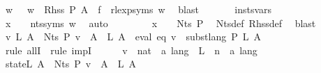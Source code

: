 \begin{isabellebody}
\ w\ \ {\isacharasterisk}{\kern0pt}{\isacharasterisk}{\kern0pt}{\isacharasterisk}{\kern0pt}{\isacharcolon}{\kern0pt}\ {\isachardoublequoteopen}w\ {\isasymin}\ Rhss\ P\ A\ {\isasymand}\ f\ {\isacharequal}{\kern0pt}\ rlexp{\isacharunderscore}{\kern0pt}syms\ w{\isachardoublequoteclose}\ \isamarkupfalse%
\ blast\isanewline
\ \ \ \ \isamarkupfalse%
\ {\isacharasterisk}{\kern0pt}{\isacharasterisk}{\kern0pt}\ insts{\isacharprime}{\kern0pt}{\isacharunderscore}{\kern0pt}vars\ \isamarkupfalse%
\ {\isachardoublequoteopen}x\ {\isasymin}\ {\isasymgamma}{\isacharprime}{\kern0pt}\ {\isacharbackquote}{\kern0pt}\ nts{\isacharunderscore}{\kern0pt}syms\ w{\isachardoublequoteclose}\ \isamarkupfalse%
\ auto\isanewline
\ \ \ \ \isamarkupfalse%
\ {\isacharasterisk}{\kern0pt}{\isacharasterisk}{\kern0pt}{\isacharasterisk}{\kern0pt}\ \isamarkupfalse%
\ {\isachardoublequoteopen}x\ {\isasymin}\ {\isasymgamma}{\isacharprime}{\kern0pt}\ {\isacharbackquote}{\kern0pt}\ Nts\ P{\isachardoublequoteclose}\ \isamarkupfalse%
\ Nts{\isacharunderscore}{\kern0pt}def\ Rhss{\isacharunderscore}{\kern0pt}def\ \isamarkupfalse%
\ blast\isanewline
\ \ \isamarkupfalse%
\isanewline
\ \ \isamarkupfalse%
\ \isamarkupfalse%
\ {\isachardoublequoteopen}{\isasymforall}v\ L{\isachardot}{\kern0pt}\ {\isacharparenleft}{\kern0pt}{\isasymforall}A\ {\isasymin}\ Nts\ P{\isachardot}{\kern0pt}\ v\ {\isacharparenleft}{\kern0pt}{\isasymgamma}{\isacharprime}{\kern0pt}\ A{\isacharparenright}{\kern0pt}\ {\isacharequal}{\kern0pt}\ L\ A{\isacharparenright}{\kern0pt}\ {\isasymlongrightarrow}\ eval\ eq\ v\ {\isacharequal}{\kern0pt}\ subst{\isacharunderscore}{\kern0pt}lang\ P\ L\ A{\isachardoublequoteclose}\isanewline
\ \ \isamarkupfalse%
\ {\isacharparenleft}{\kern0pt}rule\ allI\ {\isacharbar}{\kern0pt}\ rule\ impI{\isacharparenright}{\kern0pt}{\isacharplus}{\kern0pt}\isanewline
\ \ \ \ \isamarkupfalse%
\ v\ {\isacharcolon}{\kern0pt}{\isacharcolon}{\kern0pt}\ {\isachardoublequoteopen}nat\ {\isasymRightarrow}\ {\isacharprime}{\kern0pt}a\ lang{\isachardoublequoteclose}\ \ L\ {\isacharcolon}{\kern0pt}{\isacharcolon}{\kern0pt}\ {\isachardoublequoteopen}{\isacharprime}{\kern0pt}n\ {\isasymRightarrow}\ {\isacharprime}{\kern0pt}a\ lang{\isachardoublequoteclose}\isanewline
\ \ \ \ \isamarkupfalse%
\ state{\isacharunderscore}{\kern0pt}L{\isacharcolon}{\kern0pt}\ {\isachardoublequoteopen}{\isasymforall}A\ {\isasymin}\ Nts\ P{\isachardot}{\kern0pt}\ v\ {\isacharparenleft}{\kern0pt}{\isasymgamma}{\isacharprime}{\kern0pt}\ A{\isacharparenright}{\kern0pt}\ {\isacharequal}{\kern0pt}\ L\ A{\isachardoublequoteclose}\isanewline

\end{isabellebody}
